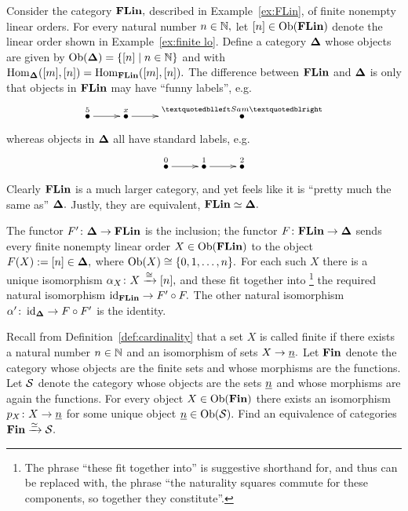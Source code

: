 \documentclass[../main/CT4S-EN-RU]{subfiles}
\begin{document}
\begin{exampleRUS}\label{ex:indiscrete cat equiv to terminal}
\end{exampleRUS}

\begin{exampleENG}\label{ex:finite linear orders}
Consider the category ${\mathbf{FLin}},$ described in Example~\ref{ex:FLin}, of finite nonempty linear orders. For every natural number $n\in{\mathbb N},$ let $[n]\in\operatorname{Ob}({\mathbf{FLin}})$ denote the linear order shown in Example~\ref{ex:finite lo}. Define a category ${\mathbf{\Delta}}$ whose objects are given by $\operatorname{Ob}({\mathbf{\Delta}})=\{[n]{\;|\;}n\in{\mathbb N}\}$ and with $\operatorname{Hom}_{{\mathbf{\Delta}}}([m],[n])=\operatorname{Hom}_{{\mathbf{FLin}}}([m],[n]).$ The difference between ${\mathbf{FLin}}$ and ${\mathbf{\Delta}}$ is only that objects in ${\mathbf{FLin}}$ may have “funny labels”, e.g. 
$$\xymatrix{\LMO{5}\ar[r]&\LMO{x}\ar[r]&\LMO{“Sam”}}$$ 
whereas objects in ${\mathbf{\Delta}}$ all have standard labels, e.g.
$$\xymatrix{\LMO{0}\ar[r]&\LMO{1}\ar[r]&\LMO{2}}$$
Clearly ${\mathbf{FLin}}$ is a much larger category, and yet feels like it is “pretty much the same as” ${\mathbf{\Delta}}.$ Justly, they are equivalent, ${\mathbf{FLin}}\simeq{\mathbf{\Delta}}.$ 

The functor $F'\colon{\mathbf{\Delta}}\rightarrow{\mathbf{FLin}}$ is the inclusion; the functor $F\colon{\mathbf{FLin}}\rightarrow{\mathbf{\Delta}}$ sends every finite nonempty linear order $X\in\operatorname{Ob}({\mathbf{FLin}})$ to the object $F(X):=[n]\in{\mathbf{\Delta}},$ where $\operatorname{Ob}(X)\cong\{0,1,\ldots,n\}.$ For each such $X$ there is a unique isomorphism $\alpha_X\colon X\xrightarrow{\cong}[n],$ and these fit together into
\footnote{The phrase “these fit together into” is suggestive shorthand for, and thus can be replaced with, the phrase “the naturality squares commute for these components, so together they constitute”.}
the required natural isomorphism $\operatorname{id}_{{\mathbf{FLin}}}\rightarrow F'\circ F.$ The other natural isomorphism $\alpha'\colon\operatorname{id}_{{\mathbf{\Delta}}}\rightarrow F\circ F'$ is the identity.
\end{exampleENG}

\begin{exampleRUS}\label{ex:finite linear orders}
\end{exampleRUS}

\begin{exerciseENG}
Recall from Definition~\ref{def:cardinality} that a set $X$ is called finite if there exists a natural number $n\in{\mathbb N}$ and an isomorphism of sets $X\rightarrow\underline{n}.$ Let ${\mathbf{Fin}}$ denote the category whose objects are the finite sets and whose morphisms are the functions. Let $\mathcal{S}$ denote the category whose objects are the sets $\underline{n}$ and whose morphisms are again the functions. For every object $X\in\operatorname{Ob}({\mathbf{Fin}})$ there exists an isomorphism $p_X\colon X\rightarrow\underline{n}$ for some unique object $\underline{n}\in\operatorname{Ob}(\mathcal{S}).$ Find an equivalence of categories ${\mathbf{Fin}}\xrightarrow{\simeq}\mathcal{S}.$ 
\end{exerciseENG}
\end{document}
